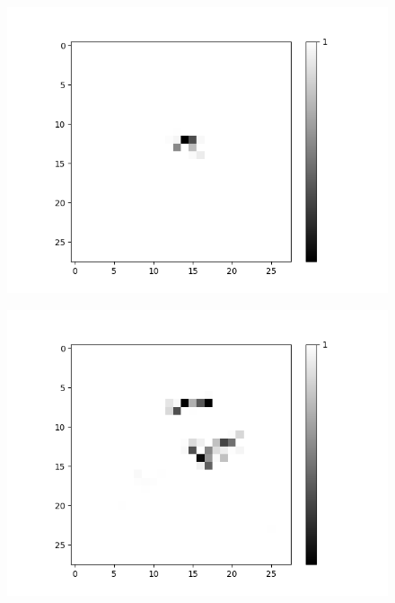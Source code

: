 \begin{figure}[H]
	\medskip
	
	\begin{minipage}[b]{0.19\textwidth}
		\includegraphics[width=\textwidth]{OR-AND(W-LSM)(1)/Like/False/Layer0-Neuron-18.png}
		\label{}
	\end{minipage}
	\begin{minipage}[b]{0.19\textwidth}
		\includegraphics[width=\textwidth]{OR-AND(W-LSM)(1)/Like/False/Layer0-Neuron-19.png}
		\label{}
	\end{minipage}
	\hfill
\end{figure}

